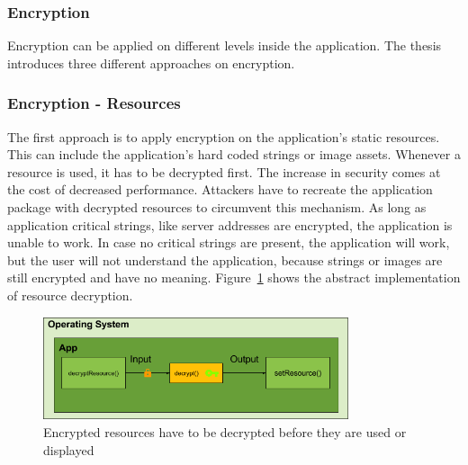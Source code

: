 \subsubsection{Encryption} \label{subsection:counter-replace-encryption-content-resource}
Encryption can be applied on different levels inside the application.
The thesis introduces three different approaches on encryption.

\subsubsection{Encryption - Resources} \label{subsection:counter-replace-encryption-content-resource}
The first approach is to apply encryption on the application's static resources.
This can include the application's hard coded strings or image assets.
Whenever a resource is used, it has to be decrypted first.
The increase in security comes at the cost of decreased performance.
Attackers have to recreate the application package with decrypted resources to circumvent this mechanism.
\newline
As long as application critical strings, like server addresses are encrypted, the application is unable to work.
In case no critical strings are present, the application will work, but the user will not understand the application, because strings or images are still encrypted and have no meaning.
\newline
Figure~\ref{fig:encryptionResource} shows the abstract implementation of resource decryption.
\begin{figure}[h]
    \centering
    \includegraphics[width=0.8\textwidth]{data/encryptionResource.png}
    \caption{Encrypted resources have to be decrypted before they are used or displayed}
    \label{fig:encryptionResource}
\end{figure}

